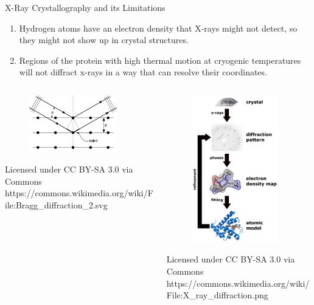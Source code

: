 \documentclass{beamer}
\begin{document}
\begin{frame}[shrink=30]{X-Ray Crystallography and its Limitations}
       \begin{enumerate}
             \item Hydrogen atoms have an electron density that X-rays might not detect, so they might not show up in crystal structures.
             \item Regions of the protein with high thermal motion at cryogenic temperatures will not diffract x-rays in a way that can resolve their coordinates.
       \end{enumerate}
  \begin{columns}
      \begin{column}{0.5\textwidth}
        \begin{figure}
           \includegraphics[width=1.5in]{../../Lecture_Pictures/XRay_Braggs_diffraction}
        \end{figure}
        {\tiny Licensed under CC BY-SA 3.0 via Commons \\ https://commons.wikimedia.org/wiki/File:Bragg\_diffraction\_2.svg}
      \end{column}
      \begin{column}{0.5\textwidth}
        \begin{figure}
           \includegraphics[width=1.5in]{../../Lecture_Pictures/X_ray_diffraction}
        \end{figure}
        {\tiny Licensed under CC BY-SA 3.0 via Commons \\ https://commons.wikimedia.org/wiki/File:X\_ray\_diffraction.png}
      \end{column}
   \end{columns}
\end{frame}
\end{document}
